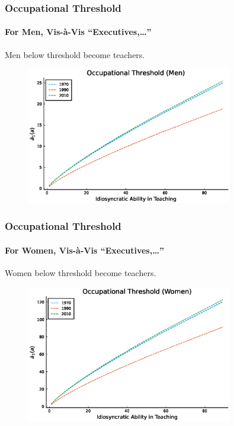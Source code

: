 \documentclass[11pt]{beamer}
\begin{document}
\begin{frame}
\frametitle{Occupational Threshold}
\framesubtitle{For Men, Vis-\`a-Vis ``Executives,\ldots''}
Men below threshold become teachers.
\begin{figure}
 \begin{center}
\includegraphics[width=0.8\textwidth]{plots/counterfactuals/counter_1/a_O_men.eps}
 			\label{ }
 		\end{center}
 	\end{figure}
\end{frame}

\begin{frame}
\frametitle{Occupational Threshold}
\framesubtitle{For Women, Vis-\`a-Vis ``Executives,\ldots''}
Women below threshold become teachers.
\begin{figure}
 \begin{center}
\includegraphics[width=0.8\textwidth]{plots/counterfactuals/counter_1/a_O_women.eps}
 			\label{ }
 		\end{center}
 	\end{figure}
\end{frame}
\end{document}
